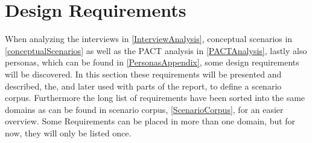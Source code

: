 \section{Design Requirements} \label{DesignRequirements}
When analyzing the interviews in \cref{InterviewAnalysis}, conceptual scenarios in \cref{conceptualScenarios} as well as the PACT analysis in \cref{PACTAnalysis}, lastly also personas, which can be found in \cref{PersonasAppendix}, some design requirements will be discovered. In this section these requirements will be presented and described, the, and later used with parts of the report, to define a scenario corpus. Furthermore the long list of requirements have been sorted into the same domains as can be found in scenario corpus, \cref{ScenarioCorpus}, for an easier overview. Some Requirements can be placed in more than one domain, but for now, they will only be listed once.
